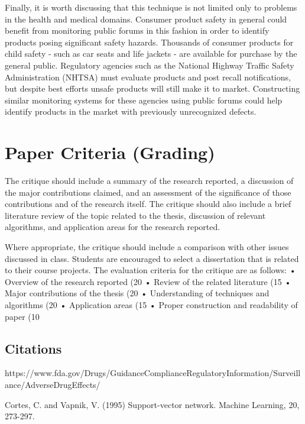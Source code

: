 \documentclass[twoside,11pt]{article}
\begin{document}
Finally, it is worth discussing that this technique is not limited only to problems in the health and medical domains. Consumer product safety in general could benefit from monitoring public forums in this fashion in order to identify products posing significant safety hazards. Thousands of consumer products for child safety - such as car seats and life jackets - are available for purchase by the general public. Regulatory agencies such as the National Highway Traffic Safety Administration (NHTSA) must evaluate products and post recall notifications, but despite best efforts unsafe products will still make it to market. Constructing similar monitoring systems for these agencies using public forums could help identify products in the market with previously unrecognized defects.





\section{Paper Criteria (Grading)}
The critique should include a summary of the research reported, a discussion of the major contributions
claimed, and an assessment of the significance of those contributions and of the research itself. The
critique should also include a brief literature review of the topic related to the thesis, discussion of relevant
algorithms, and application areas for the research reported.

Where appropriate, the critique should
include a comparison with other issues discussed in class. Students are encouraged to select a
dissertation that is related to their course projects.
The evaluation criteria for the critique are as follows:
• Overview of the research reported (20%
• Review of the related literature (15%
• Major contributions of the thesis (20%
• Understanding of techniques and algorithms (20%
• Application areas (15%
• Proper construction and readability of paper (10%




\newpage



\subsection{Citations}
https://www.fda.gov/Drugs/GuidanceComplianceRegulatoryInformation/Surveillance/AdverseDrugEffects/


Cortes, C. and Vapnik, V. (1995) Support-vector network. Machine Learning, 20, 273-297.
\end{document}
